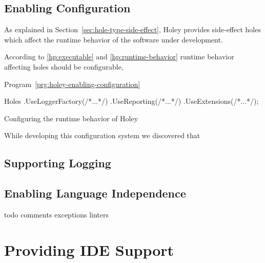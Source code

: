 \subsection{Enabling Configuration}
\label{sec:holey-enabling-configuration}
As explained in Section~\ref{sec:hole-type-side-effect}, Holey provides side-effect holes which affect the runtime behavior of the software under development.

According to \ref{hp:executable} and \ref{hp:runtime-behavior} runtime behavior affecting holes should be configurable, 

Program~\ref{prg:holey-enabling-configuration}

\begin{program}[ht]
\begin{CsCode}
Holes
	.UseLoggerFactory(/*...*/)
	.UseReporting(/*...*/)
	.UseExtensions(/*...*/);
\end{CsCode}
\caption{Configuring the runtime behavior of Holey}
\label{prg:holey-enabling-configuration}
\end{program}

While developing this configuration system we discovered that 


\subsection{Supporting Logging}

\subsection{Enabling Language Independence}
todo comments
exceptions
linters

\section{Providing IDE Support}
\label{sec:providing-ide-support}

